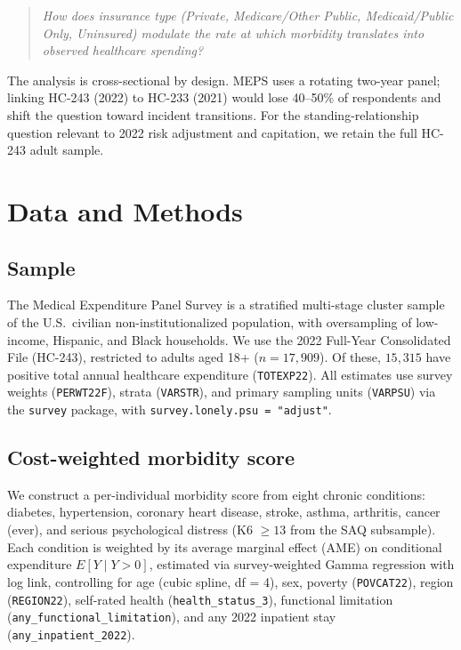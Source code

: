 \documentclass[11pt,a4paper]{article}
\begin{document}
\begin{quote}
\emph{How does insurance type (Private, Medicare/Other Public, Medicaid/Public Only, Uninsured) modulate the rate at which morbidity translates into observed healthcare spending?}
\end{quote}

The analysis is cross-sectional by design. MEPS uses a rotating two-year panel; linking HC-243 (2022) to HC-233 (2021) would lose 40--50\% of respondents and shift the question toward incident transitions. For the standing-relationship question relevant to 2022 risk adjustment and capitation, we retain the full HC-243 adult sample.

\section{Data and Methods}

\subsection{Sample}

The Medical Expenditure Panel Survey \citep{ahrq2024} is a stratified multi-stage cluster sample of the U.S.\ civilian non-institutionalized population, with oversampling of low-income, Hispanic, and Black households. We use the 2022 Full-Year Consolidated File (HC-243), restricted to adults aged 18+ ($n = 17{,}909$). Of these, $15{,}315$ have positive total annual healthcare expenditure (\texttt{TOTEXP22}). All estimates use survey weights (\texttt{PERWT22F}), strata (\texttt{VARSTR}), and primary sampling units (\texttt{VARPSU}) via the \texttt{survey} package, with \texttt{survey.lonely.psu = "adjust"}.

\subsection{Cost-weighted morbidity score}

We construct a per-individual morbidity score from eight chronic conditions: diabetes, hypertension, coronary heart disease, stroke, asthma, arthritis, cancer (ever), and serious psychological distress (K6 $\geq 13$ from the SAQ subsample). Each condition is weighted by its average marginal effect (AME) on conditional expenditure $E[Y \mid Y > 0]$, estimated via survey-weighted Gamma regression with log link, controlling for age (cubic spline, df = 4), sex, poverty (\texttt{POVCAT22}), region (\texttt{REGION22}), self-rated health (\texttt{health\_status\_3}), functional limitation (\texttt{any\_functional\_limitation}), and any 2022 inpatient stay (\texttt{any\_inpatient\_2022}).
\end{document}
